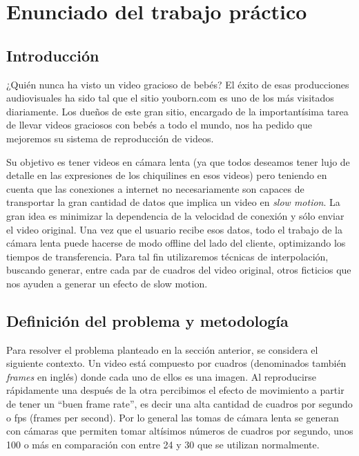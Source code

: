 \section{Enunciado del trabajo práctico}

    \subsection{Introducci\'on}

    ¿Quién nunca ha visto un video gracioso de bebés? El éxito de esas producciones audiovisuales ha sido tal que el sitio youborn.com es uno de los más visitados diariamente. Los dueños de este gran sitio, encargado de la importantísima tarea de llevar videos graciosos con bebés a todo el mundo, nos ha pedido que mejoremos su sistema de reproducción de videos.

    Su objetivo es tener videos en cámara lenta (ya que todos deseamos tener lujo de detalle en las expresiones de los chiquilines en esos videos) pero teniendo en cuenta que las conexiones a internet no necesariamente son capaces de transportar la gran cantidad de datos que implica un video en \textit{slow motion}. La gran idea es minimizar la dependencia de la velocidad de conexi\'on y s\'olo enviar el video original. Una vez que el usuario recibe esos datos, todo el trabajo de la cámara lenta puede hacerse de modo offline del lado del cliente, optimizando los tiempos de transferencia. Para tal fin utilizaremos técnicas de interpolación, buscando generar, entre cada par de cuadros del video original, otros ficticios que nos ayuden a generar un efecto de slow motion.


    \vskip 5pt

    \subsection{Definici\'on del problema y metodolog\'ia}

    Para resolver el problema planteado en la secci\'on anterior, se considera el siguiente contexto. Un video está compuesto por cuadros (denominados también \textit{frames} en inglés) donde cada uno de ellos es una imagen. Al reproducirse rápidamente una después de la otra percibimos el efecto de movimiento a partir de tener un ``buen frame rate'', es decir una alta cantidad de cuadros por segundo o fps (frames per second). Por lo general las tomas de cámara lenta se generan con cámaras que permiten tomar altísimos números de cuadros por segundo, unos 100 o m\'as en comparaci\'on con entre 24 y 30 que se utilizan normalmente. 

